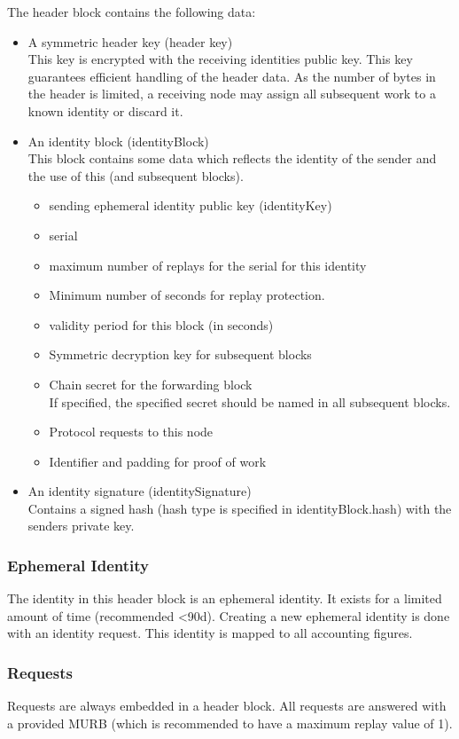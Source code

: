 The header block contains the following data:
\begin{itemize}
	\item A symmetric header key (header key)\\
	This key is encrypted with the receiving identities public key. This key guarantees efficient handling of the header data. As the number of bytes in the header is limited, a receiving node may assign all subsequent work to a known identity or discard it.
	\item An identity block (identityBlock)\\
	This block contains some data which reflects the identity of the sender and the use of this (and subsequent blocks).
	\begin{itemize}
		\item sending ephemeral identity public key (identityKey)
		\item serial
		\item maximum number of replays for the serial for this identity
		\item Minimum number of seconds for replay protection.
		\item validity period for this block (in seconds)
		\item Symmetric decryption key for subsequent blocks
		\item Chain secret for the forwarding block\\
		If specified, the specified secret should be named in all subsequent blocks.
		\item Protocol requests to this node
		\item Identifier and padding for proof of work
	\end{itemize}
	\item An identity signature (identitySignature)\\
	Contains a signed hash (hash type is specified in identityBlock.hash) with the senders private key.
\end{itemize}

\subsubsection{Ephemeral Identity}
The identity in this header block is an ephemeral identity. It exists for a limited amount of time (recommended <90d). Creating a new ephemeral identity is done with an identity request. This identity is mapped to all accounting figures.

\subsubsection{Requests\label{sec:request}}
Requests are always embedded in a header block. All requests are answered with a provided MURB (which is recommended to have a maximum replay value of 1).

